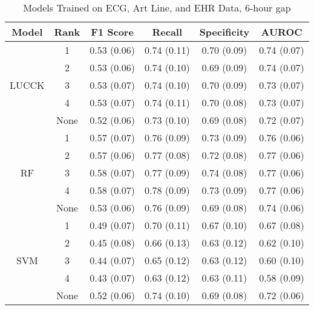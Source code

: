\begin{table}
    \centering
    \caption{Models Trained on ECG, Art Line, and EHR Data, 6-hour gap}
    \begin{tabularx}{\textwidth}{|c|c|C|C|C|C|}
        \hline
        Model & Rank & F1 Score & Recall & Specificity & AUROC \\
        \hline
        & 1 & 0.53 (0.06) & 0.74 (0.11) & 0.70 (0.09) & 0.74 (0.07)\\
        & 2 & 0.53 (0.06) & 0.74 (0.10) & 0.69 (0.09) & 0.74 (0.07)\\
        LUCCK & 3 & 0.53 (0.07) & 0.74 (0.10) & 0.70 (0.09) & 0.73 (0.07)\\
        & 4 & 0.53 (0.07) & 0.74 (0.11) & 0.70 (0.08) & 0.73 (0.07)\\
        & None & 0.52 (0.06) & 0.73 (0.10) & 0.69 (0.08) & 0.72 (0.07)\\
        \hline
        & 1 & 0.57 (0.07) & 0.76 (0.09) & 0.73 (0.09) & 0.76 (0.06)\\
        & 2 & 0.57 (0.06) & 0.77 (0.08) & 0.72 (0.08) & 0.77 (0.06)\\
        RF & 3 & 0.58 (0.07) & 0.77 (0.09) & 0.74 (0.08) & 0.77 (0.06)\\
        & 4 & 0.58 (0.07) & 0.78 (0.09) & 0.73 (0.09) & 0.77 (0.06)\\
        & None & 0.53 (0.06) & 0.76 (0.09) & 0.69 (0.08) & 0.74 (0.06)\\
        \hline
        & 1 & 0.49 (0.07) & 0.70 (0.11) & 0.67 (0.10) & 0.67 (0.08)\\
        & 2 & 0.45 (0.08) & 0.66 (0.13) & 0.63 (0.12) & 0.62 (0.10)\\
        SVM & 3 & 0.44 (0.07) & 0.65 (0.12) & 0.63 (0.12) & 0.60 (0.10)\\
        & 4 & 0.43 (0.07) & 0.63 (0.12) & 0.63 (0.11) & 0.58 (0.09)\\
        & None & 0.52 (0.06) & 0.74 (0.10) & 0.69 (0.08) & 0.72 (0.06)\\
        \hline
    \end{tabularx}
\end{table}


